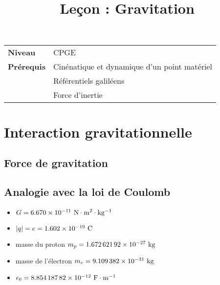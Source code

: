 \documentclass[10pt]{beamer}
\title{Leçon : Gravitation}
\begin{document}
\begin{frame}{}
    \titlepage

    \begin{tabularx}{\textwidth}{l@{:\,\,}X}
        \textbf{Niveau} 	  & CPGE\\
        \textbf{Prérequis} & Cinénatique et dynamique d'un point matériel\\
        &			Référentiels galiléens\\
        & 			Force d'inertie
    \end{tabularx}
\end{frame}


\section{Interaction gravitationnelle}

\subsection{Force de gravitation}
\subsection{Analogie avec la loi de Coulomb}

\begin{frame}{\insertsubsection}
    \begin{table}
        \centering
{}
    \pause
    \begin{itemize}
        \item $G = \num{6.670e-11}\rm~N\cdot m^2\cdot kg^{-1}$
        \item $|q|=e=\num{1.602e-19}~\rm C$    
        \item masse du proton $m_p = \num{1.67262192e-27}~\rm kg$
        \item masse de l'électron $m_e = \num{9.109382e-31}~\rm  kg$
        \item $\epsilon_0 = \num{8.85418782e-12}~\rm F\cdot m^{-1}$ 
    \end{itemize}
\end{table}
\end{frame}
\end{document}
